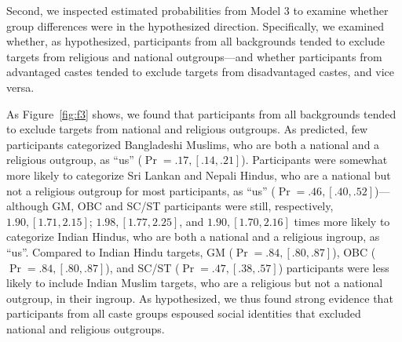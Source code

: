 \documentclass[12pt, a4paper]{article}
\begin{document}
Second, we inspected estimated probabilities from Model 3 to examine whether group differences were in the hypothesized direction. Specifically, we examined whether, as hypothesized, participants from all backgrounds tended to exclude targets from religious and national outgroups---and whether participants from advantaged castes tended to exclude targets from disadvantaged castes, and vice versa. 

As Figure~\ref{fig:f3} shows, we found that participants from all backgrounds tended to exclude targets from national and religious outgroups. As predicted, few participants categorized Bangladeshi Muslims, who are both a national and a religious outgroup, as “us” ($\Pr = .17, [.14, .21]$). Participants were somewhat more likely to categorize Sri Lankan and Nepali Hindus, who are a national but not a religious outgroup for most participants, as “us” ($\Pr = .46, [.40, .52]$)---although GM, OBC and SC/ST participants were still, respectively, $1.90, [1.71, 2.15]$; $1.98, [1.77, 2.25]$, and $1.90, [1.70, 2.16]$ times more likely to categorize Indian Hindus, who are both a national and a religious ingroup, as “us”. Compared to Indian Hindu targets, GM ($\Pr = .84, [.80, .87]$), OBC ($\Pr = .84, [.80, .87]$), and SC/ST ($\Pr = .47, [.38, .57]$) participants were less likely to include Indian Muslim targets, who are a religious but not a national outgroup, in their ingroup. As hypothesized, we thus found strong evidence that participants from all caste groups espoused social identities that excluded national and religious outgroups.
\end{document}
